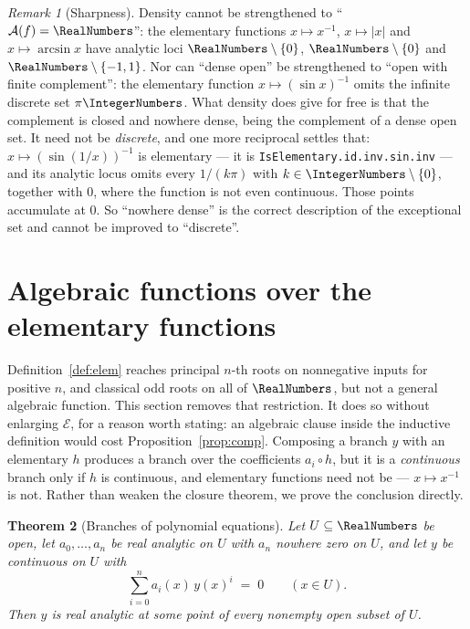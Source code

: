 \documentclass[11pt,oneside]{article}
\newtheorem{theorem}{Theorem}[section]
\theoremstyle{definition}
\theoremstyle{remark}
\newtheorem{remark}[theorem]{Remark}
\newcommand{\Elem}{\mathcal E}
\newcommand{\An}{\mathcal A}
\begin{document}
\begin{remark}[Sharpness]
Density cannot be strengthened to ``$\An(f)=\RealNumbers$'': the elementary functions
$x\mapsto x^{-1}$, $x\mapsto|x|$ and $x\mapsto\arcsin x$ have analytic loci
$\RealNumbers\setminus\{0\}$, $\RealNumbers\setminus\{0\}$ and $\RealNumbers\setminus\{-1,1\}$.  Nor can
``dense open'' be strengthened to ``open with finite complement'': the
elementary function $x\mapsto (\sin x)^{-1}$ omits the infinite discrete set
$\pi\IntegerNumbers$.  What density does give for free is that the complement is closed
and nowhere dense, being the complement of a dense open set.  It need not be
\emph{discrete}, and one more reciprocal settles that: $x\mapsto(\sin(1/x))^{-1}$
is elementary --- it is \texttt{IsElementary.id.inv.sin.inv} --- and its
analytic locus omits every $1/(k\pi)$ with $k\in\IntegerNumbers\setminus\{0\}$, together
with $0$, where the function is not even continuous.  Those points accumulate
at $0$.  So ``nowhere dense'' is the correct description of the exceptional
set and cannot be improved to ``discrete''.
\end{remark}

\section[Algebraic branches]{Algebraic functions over the elementary functions}\label{sec:algebraic}

Definition~\ref{def:elem} reaches principal $n$-th roots on nonnegative inputs
for positive $n$, and classical odd roots on all of $\RealNumbers$, but not a general
algebraic function.  This section removes that restriction.  It does so without
enlarging $\Elem$, for a reason worth stating: an algebraic clause inside the
inductive definition would cost Proposition~\ref{prop:comp}.  Composing a
branch $y$ with an elementary $h$ produces a branch over the coefficients
$a_i\circ h$, but it is a \emph{continuous} branch only if $h$ is continuous,
and elementary functions need not be --- $x\mapsto x^{-1}$ is not.  Rather than
weaken the closure theorem, we prove the conclusion directly.

\begin{theorem}[Branches of polynomial equations]\label{thm:algebraic}
Let $U\subseteq\RealNumbers$ be open, let $a_0,\dots,a_n$ be real analytic on $U$ with
$a_n$ nowhere zero on $U$, and let $y$ be continuous on $U$ with
\[
  \sum_{i=0}^{n} a_i(x)\,y(x)^i \;=\; 0 \qquad (x\in U).
\]
Then $y$ is real analytic at some point of every nonempty open subset of $U$.
\end{theorem}
\end{document}
